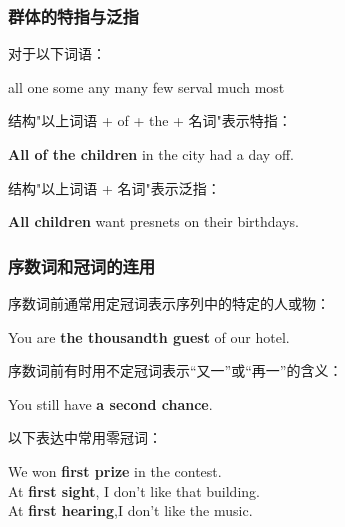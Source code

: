 \documentclass[UTF8]{ctexart}
\newcommand{\littf}[1]{{\hspace{3pt}\ttfamily #1}}
\begin{document}
\subsubsection{群体的特指与泛指}
    对于以下词语：
    \begin{center}
        \ttfamily
        all one some any many few serval much most\\[4mm]
    \end{center}
    结构\littf{"\hspace{0pt}以上词语 + of + the + 名词"}表示特指：
    \begin{center}
        \large\ttfamily
        \textbf{All of the children} in the city had a day off.\\[4mm]
    \end{center}
    结构\littf{"\hspace{0pt}以上词语 + 名词"}表示泛指：
    \begin{center}
        \large\ttfamily
        \textbf{All children} want presnets on their birthdays.
    \end{center}

\newpage

\subsubsection{序数词和冠词的连用}
    序数词前通常用定冠词表示序列中的特定的人或物：
    \begin{center}
        \large\ttfamily
        You are \textbf{the thousandth guest} of our hotel.\\[4mm]
    \end{center}
    序数词前有时用不定冠词表示“又一”或“再一”的含义：
    \begin{center}
        \large\ttfamily
        You still have \textbf{a second chance}.\\[4mm]
    \end{center}
    以下表达中常用零冠词：
    \begin{center}
        \large\ttfamily
        We won \textbf{first prize} in the contest.\\[2mm]
        At \textbf{first sight}, I don't like that building.\\[3mm]
        At \textbf{first hearing},I don't like the music.
    \end{center}\vspace{5pt}
\end{document}
